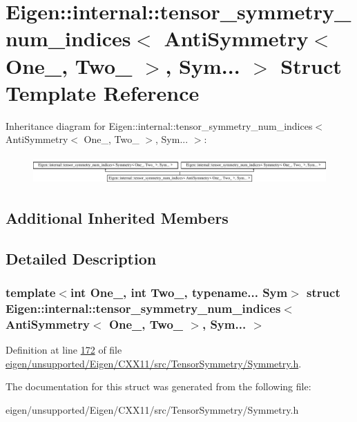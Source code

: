 \hypertarget{struct_eigen_1_1internal_1_1tensor__symmetry__num__indices_3_01_anti_symmetry_3_01_one___00_01_two___01_4_00_01_sym_8_8_8_01_4}{}\section{Eigen\+:\+:internal\+:\+:tensor\+\_\+symmetry\+\_\+num\+\_\+indices$<$ Anti\+Symmetry$<$ One\+\_\+, Two\+\_\+ $>$, Sym... $>$ Struct Template Reference}
\label{struct_eigen_1_1internal_1_1tensor__symmetry__num__indices_3_01_anti_symmetry_3_01_one___00_01_two___01_4_00_01_sym_8_8_8_01_4}
Inheritance diagram for Eigen\+:\+:internal\+:\+:tensor\+\_\+symmetry\+\_\+num\+\_\+indices$<$ Anti\+Symmetry$<$ One\+\_\+, Two\+\_\+ $>$, Sym... $>$\+:\begin{figure}[H]
\begin{center}
\leavevmode
\includegraphics[height=1.081081cm]{struct_eigen_1_1internal_1_1tensor__symmetry__num__indices_3_01_anti_symmetry_3_01_one___00_01_two___01_4_00_01_sym_8_8_8_01_4}
\end{center}
\end{figure}
\subsection*{Additional Inherited Members}


\subsection{Detailed Description}
\subsubsection*{template$<$int One\+\_\+, int Two\+\_\+, typename... Sym$>$\newline
struct Eigen\+::internal\+::tensor\+\_\+symmetry\+\_\+num\+\_\+indices$<$ Anti\+Symmetry$<$ One\+\_\+, Two\+\_\+ $>$, Sym... $>$}



Definition at line \hyperlink{eigen_2unsupported_2_eigen_2_c_x_x11_2src_2_tensor_symmetry_2_symmetry_8h_source_l00172}{172} of file \hyperlink{eigen_2unsupported_2_eigen_2_c_x_x11_2src_2_tensor_symmetry_2_symmetry_8h_source}{eigen/unsupported/\+Eigen/\+C\+X\+X11/src/\+Tensor\+Symmetry/\+Symmetry.\+h}.



The documentation for this struct was generated from the following file\+:\begin{DoxyCompactItemize}
\item 
eigen/unsupported/\+Eigen/\+C\+X\+X11/src/\+Tensor\+Symmetry/\+Symmetry.\+h\end{DoxyCompactItemize}
